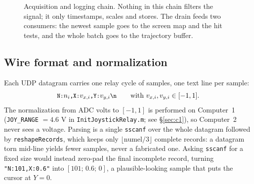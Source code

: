 \documentclass[11pt,a4paper]{article}
\newcommand{\code}[1]{\texttt{\small #1}}
\newcommand{\file}[1]{\texttt{\small #1}}
\begin{document}
\begin{figure}[htbp]
{}
\caption{Acquisition and logging chain. Nothing in this chain filters the
signal; it only timestamps, scales and stores. The drain feeds two consumers:
the newest sample goes to the screen map and the hit tests, and the whole batch
goes to the trajectory buffer.}
\label{fig:chain}
\end{figure}

\subsection{Wire format and normalization}

Each UDP datagram carries one relay cycle of samples, one text line per sample:
\[
  \code{N:}n_i\code{,X:}v_{x,i}\code{,Y:}v_{y,i}\code{\textbackslash n}
  \qquad\text{with } v_{x,i}, v_{y,i} \in [-1,1].
\]
The normalization from ADC volts to $[-1,1]$ is performed on Computer~1
(\code{JOY\_RANGE} $= 4.6$ V in \file{InitJoystickRelay.m}; see
\S\ref{sec:c1}), so Computer~2 never sees a voltage. Parsing is a single
\code{sscanf} over the whole datagram followed by \code{reshapeRecords}, which
keeps only $\lfloor \text{numel}/3 \rfloor$ complete records: a datagram torn
mid-line yields fewer samples, never a fabricated one. Asking \code{sscanf} for
a fixed size would instead zero-pad the final incomplete record, turning
\code{"N:101,X:0.6"} into $[101;\,0.6;\,0]$, a plausible-looking sample that
puts the cursor at $Y=0$.
\end{document}
